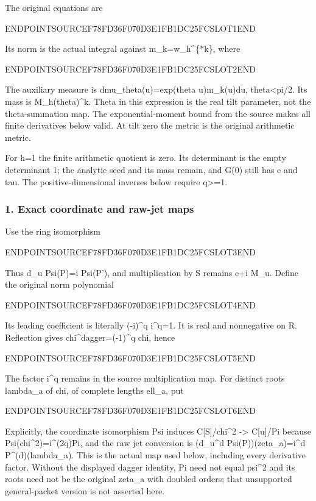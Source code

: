 The original equations are

ENDPOINTSOURCEF78FD36F070D3E1FB1DC25FCSLOT1END

Its norm is the actual integral against m\_k=w\_h\^{}\{*k\}, where

ENDPOINTSOURCEF78FD36F070D3E1FB1DC25FCSLOT2END

The auxiliary measure is dmu\_theta(u)=exp(theta u)m\_k(u)du, \textbar theta\textbar\textless pi/2. Its mass is M\_h(theta)\^{}k. Theta in this expression is the real tilt parameter, not the theta-summation map. The exponential-moment bound from the source makes all finite derivatives below valid. At tilt zero the metric is the original arithmetic metric.

For h=1 the finite arithmetic quotient is zero. Its determinant is the empty determinant 1; the analytic seed and its mass remain, and G(0) still has e and tau. The positive-dimensional inverses below require q\textgreater=1.

\subsubsection{1. Exact coordinate and raw-jet maps}\label{endpoint-pr24_current_corrected--exact-coordinate-and-raw-jet-maps}

Use the ring isomorphism

ENDPOINTSOURCEF78FD36F070D3E1FB1DC25FCSLOT3END

Thus d\_u Psi(P)=i Psi(P'), and multiplication by S remains c+i M\_u. Define the original norm polynomial

ENDPOINTSOURCEF78FD36F070D3E1FB1DC25FCSLOT4END

Its leading coefficient is literally (-i)\^{}q i\^{}q=1. It is real and nonnegative on R. Reflection gives chi\^{}dagger=(-1)\^{}q chi, hence

ENDPOINTSOURCEF78FD36F070D3E1FB1DC25FCSLOT5END

The factor i\^{}q remains in the source multiplication map. For distinct roots lambda\_a of chi, of complete lengths ell\_a, put

ENDPOINTSOURCEF78FD36F070D3E1FB1DC25FCSLOT6END

Explicitly, the coordinate isomorphism Psi induces C{[}S{]}/chi\^{}2 -\textgreater{} C{[}u{]}/Pi because Psi(chi\^{}2)=i\^{}(2q)Pi, and the raw jet conversion is (d\_u\^{}d Psi(P))(zeta\_a)=i\^{}d P\^{}(d)(lambda\_a). This is the actual map used below, including every derivative factor. Without the displayed dagger identity, Pi need not equal psi\^{}2 and its roots need not be the original zeta\_a with doubled orders; that unsupported general-packet version is not asserted here.

